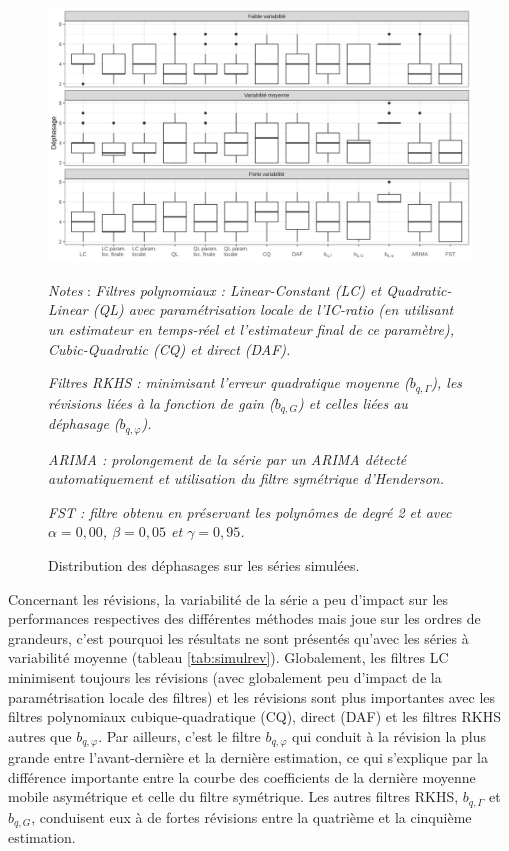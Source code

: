 \documentclass[
  12pt,
  a4paper,french]{article}
\newcommand\1{\mathds{1}}
\begin{document}
\begin{figure}

{\centering \includegraphics[width=1\linewidth]{img/simulations/phase_shift_simul} 

}

\caption[Distribution des déphasages sur les séries simulées]{Distribution des déphasages sur les séries simulées.}\label{fig:graphstpsimul}

\footnotesize


\emph{Notes} : \emph{Filtres polynomiaux : \emph{Linear-Constant} (LC) et \emph{Quadratic-Linear} (QL) avec paramétrisation locale de l'IC-ratio (en utilisant un estimateur en temps-réel et l'estimateur final de ce paramètre), \emph{Cubic-Quadratic} (CQ) et direct (DAF).}

\emph{Filtres RKHS : minimisant l'erreur quadratique moyenne (\(b_{q,\Gamma}\)), les révisions liées à la fonction de gain (\(b_{q,G}\)) et celles liées au déphasage (\(b_{q,\varphi}\)).}

\emph{ARIMA : prolongement de la série par un ARIMA détecté automatiquement et utilisation du filtre symétrique d'Henderson.}

\emph{FST : filtre obtenu en préservant les polynômes de degré 2 et avec \(\alpha=0,00\), \(\beta=0,05\) et \(\gamma=0,95\).}
\normalsize\end{figure}

Concernant les révisions, la variabilité de la série a peu d'impact sur les performances respectives des différentes méthodes mais joue sur les ordres de grandeurs, c'est pourquoi les résultats ne sont présentés qu'avec les séries à variabilité moyenne (tableau \ref{tab:simulrev}).
Globalement, les filtres LC minimisent toujours les révisions (avec globalement peu d'impact de la paramétrisation locale des filtres) et les révisions sont plus importantes avec les filtres polynomiaux cubique-quadratique (CQ), direct (DAF) et les filtres RKHS autres que \(b_{q,\varphi}\).
Par ailleurs, c'est le filtre \(b_{q,\varphi}\) qui conduit à la révision la plus grande entre l'avant-dernière et la dernière estimation, ce qui s'explique par la différence importante entre la courbe des coefficients de la dernière moyenne mobile asymétrique et celle du filtre symétrique.
Les autres filtres RKHS, \(b_{q,\Gamma}\) et \(b_{q,G}\), conduisent eux à de fortes révisions entre la quatrième et la cinquième estimation.
\end{document}
